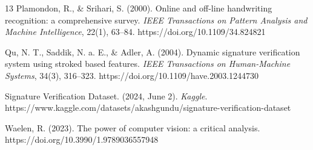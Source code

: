 \documentclass[12pt]{article}
\begin{document}
\begin{thebibliography}{13}
Plamondon, R., \& Srihari, S. (2000). Online and off-line handwriting recognition: a comprehensive survey. \textit{IEEE Transactions on Pattern Analysis and Machine Intelligence}, 22(1), 63–84. https://doi.org/10.1109/34.824821

Qu, N. T., Saddik, N. a. E., \& Adler, A. (2004). Dynamic signature verification system using stroked based features. \textit{IEEE Transactions on Human-Machine Systems}, 34(3), 316–323. https://doi.org/10.1109/have.2003.1244730

Signature Verification Dataset. (2024, June 2). \textit{Kaggle}. https://www.kaggle.com/datasets/akashgundu/signature-verification-dataset

Waelen, R. (2023). The power of computer vision: a critical analysis. https://doi.org/10.3990/1.9789036557948

\end{thebibliography}
\end{document}
